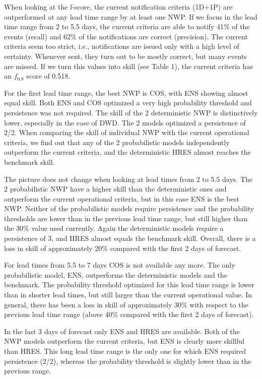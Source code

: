 \documentclass[preprint,12pt,authoryear]{elsarticle}
\begin{document}
When looking at the f-score, the current notification criteria (1D+1P) are outperformed at any lead time range by at least one NWP. If we focus in the lead time range from 2 to 5.5 days, the current criteria are able to notify 41\% of the events (recall) and 62\% of the notifications are correct (precision). The current criteria seem too strict, i.e., notifications are issued only with a high level of certainty. Whenever sent, they turn out to be mostly correct, but many events are missed. If we turn this values into skill (see Table 1), the current criteria  has an $f_{0.8}$ score of 0.518.

For the first lead time range, the best NWP is COS, with ENS showing almost equal skill. Both ENS and COS optimized a very high probability threshold and persistence was not required. The skill of the 2 deterministic NWP is distinctively lower, especially in the case of DWD. The 2 models optimized a persistence of 2/2. When comparing the skill of individual NWP with the current operational criteria, we find out that any of the 2 probabilistic models independently outperform the current criteria, and the deterministic HRES almost reaches the benchmark skill.

The picture does not change when looking at lead times from 2 to 5.5 days. The 2 probabilistic NWP have a higher skill than the deterministic ones and outperform the current operational criteria, but in this case ENS is the best NWP. Neither of the probabilistic models require persistence and the probability thresholds are lower than in the previous lead time range, but still higher than the 30\% value used currently. Again the deterministic models require a persistence of 3, and HRES almost equals the benchmark skill. Overall, there is a loss in skill of approximately 20\% compared with the first 2 days of forecast. 

For lead times from 5.5 to 7 days COS is not available any more. The only probabilistic model, ENS, outperforms the deterministic models and the benchmark. The probability threshold optimized for this lead time range is lower than in shorter lead times, but still larger than the current operational value. In general, there has been a loss in skill of approximately 30\% with respect to the previous lead time range (above 40\% compared with the first 2 days of forecast).

In the last 3 days of forecast only ENS and HRES are available. Both of the NWP models outperform the current criteria, but ENS is clearly more skillful than HRES. This long lead time range is the only one for which ENS required persistence (2/2), whereas the probability threshold is slightly lower than in the previous range.
\end{document}
